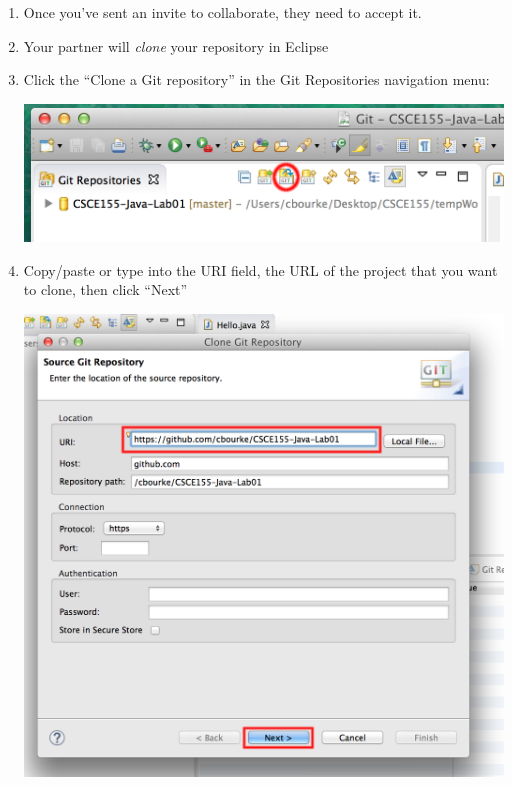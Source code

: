 \documentclass[12pt]{scrartcl}
\begin{document}
\begin{enumerate}

  \item Once you've sent an invite to collaborate, they need to 
  accept it.
  
  \item Your partner will \emph{clone} your repository in Eclipse

  \item Click the ``Clone a Git repository'' in the Git Repositories navigation menu:
  	\begin{center}
	\includegraphics[scale=0.50]{./hack1.0-files/eclipseGitRepoMarkUp}
	\end{center}
  \item Copy/paste or type into the URI field, the URL of the project that 
  	you want to clone, then click ``Next''
	\begin{center}
	\includegraphics[scale=0.35]{./hack1.0-files/eclipseCloneDialogAMarkUp}
	\end{center}

\end{enumerate}
\end{document}
